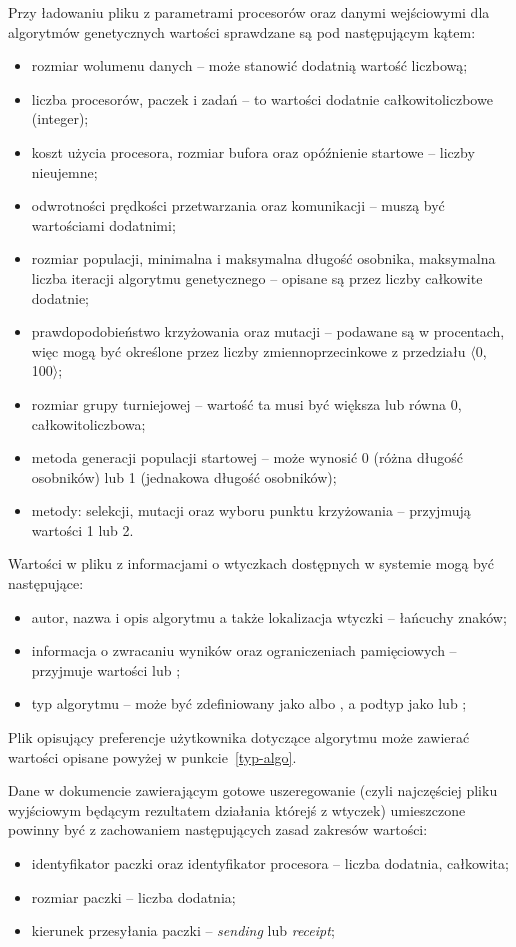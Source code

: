 Przy ładowaniu pliku z parametrami procesorów oraz danymi wejściowymi dla algorytmów genetycznych wartości sprawdzane są pod następującym kątem:
\begin{itemize}
	\item rozmiar wolumenu danych -- może stanowić dodatnią wartość liczbową;
	\item liczba procesorów, paczek i zadań -- to wartości dodatnie całkowitoliczbowe (integer);
	\item koszt użycia procesora, rozmiar bufora oraz opóźnienie startowe -- liczby nieujemne;
	\item odwrotności prędkości przetwarzania oraz komunikacji -- muszą być wartościami dodatnimi;
	\item rozmiar populacji, minimalna i maksymalna długość osobnika, maksymalna liczba iteracji algorytmu genetycznego -- 
		opisane są przez liczby całkowite dodatnie;
	\item prawdopodobieństwo krzyżowania oraz mutacji -- podawane są w procentach, więc mogą być określone przez liczby zmiennoprzecinkowe 
		z przedziału $\langle$0, 100$\rangle$;
	\item rozmiar grupy turniejowej -- wartość ta musi być większa lub równa 0, całkowitoliczbowa;
	\item metoda generacji populacji startowej -- może wynosić 0 (różna długość osobników) lub 1 (jednakowa długość osobników);
	\item metody: selekcji, mutacji oraz wyboru punktu krzyżowania -- przyjmują wartości 1 lub 2.
\end{itemize}

Wartości w pliku z informacjami o wtyczkach dostępnych w systemie mogą być następujące:
\begin{itemize}
	\item autor, nazwa i opis algorytmu a także lokalizacja wtyczki -- łańcuchy znaków;
	\item informacja o zwracaniu wyników oraz ograniczeniach pamięciowych -- przyjmuje wartości  lub ;
	\item\label{typ-algo} typ algorytmu -- może być zdefiniowany jako  albo , a podtyp jako  lub ;
\end{itemize}

Plik opisujący preferencje użytkownika dotyczące algorytmu może zawierać wartości opisane powyżej w punkcie~\vref{typ-algo}.

Dane w dokumencie zawierającym gotowe uszeregowanie (czyli najczęściej pliku wyjściowym będącym rezultatem działania którejś z wtyczek) umieszczone 
powinny być z zachowaniem następujących zasad zakresów wartości:
\begin{itemize}
	\item identyfikator paczki oraz identyfikator procesora -- liczba dodatnia, całkowita;
	\item rozmiar paczki -- liczba dodatnia;
	\item kierunek przesyłania paczki -- \emph{sending} lub \emph{receipt};
\end{itemize}

